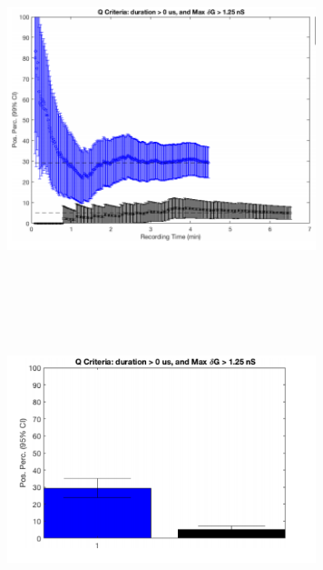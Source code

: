 \documentclass{article}
\begin{document}
\begin{landscape}
\begin{multicols}{3}
\includegraphics[width=9cm, height=9.5cm]{4} %
\newline
\newline
\includegraphics[width=9cm, height=9.5cm]{2} %
  

\end{multicols}
\end{landscape}
\end{document}

